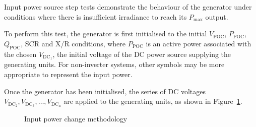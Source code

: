 Input power source step tests demonstrate the behaviour of the generator under conditions where there is insufficient irradiance to reach its $P_{\mathrm{max}}$ output.


To perform this test, the generator is first initialised to the initial $V_{\mathrm{POC}}$, $P_{\mathrm{POC}}$, $Q_{\mathrm{POC}}$, SCR and X/R conditions, where $P_{\mathrm{POC}}$ is an active power associated with the chosen $V_{\mathrm{DC}_{\mathrm{1}}}$, the initial voltage of the DC power source supplying the generating units. For non-inverter systems, other symbols may be more appropriate to represent the input power.

Once the generator has been initialised, the series of DC voltages $V_{\mathrm{DC}_{\mathrm{2}}}, V_{\mathrm{DC}_{\mathrm{3}}}, \dots, V_{\mathrm{DC}_{\mathrm{n}}}$ are applied to the generating units, as shown in Figure~\ref{fig:smib-input-power-change-methodology}.

\begin{figure}[h]
	\centering
	
	\caption{Input power change methodology}
	\label{fig:smib-input-power-change-methodology}
\end{figure}